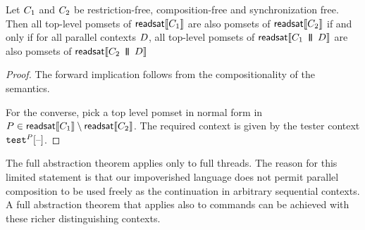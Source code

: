 \begin{theorem}
  Let $C_1$ and $C_2$ be restriction-free, composition-free and
  synchronization free.  Then all top-level pomsets of
  $\mathsf{readsat}\llbracket C_1\rrbracket$ are also pomsets of $\mathsf{readsat}\llbracket C_2\rrbracket$ if
  and only if for all parallel contexts $D$, all top-level pomsets of
  $\mathsf{readsat}\llbracket C_1 \,\mathbin{\texttt{\textbf{|}}\mkern-6mu\texttt{\textbf{|}}}\, D\rrbracket$ are also pomsets of
  $\mathsf{readsat}\llbracket C_2 \,\mathbin{\texttt{\textbf{|}}\mkern-6mu\texttt{\textbf{|}}}\, D\rrbracket$
\begin{proof}
  The forward implication follows from the compositionality of the semantics.

  For the converse, pick a top level pomset in normal form in
  $P \in \mathsf{readsat}\llbracket C_1\rrbracket \setminus \mathsf{readsat}\llbracket C_2\rrbracket $.  The
  required context is given by the tester context $\testP{\aPS}{}\hole{}$.
 \end{proof}
\end{theorem}

The full abstraction theorem applies only to full threads.  The reason for this limited statement is that our impoverished language does not permit  parallel composition to be used freely as the continuation in arbitrary sequential contexts.  A full abstraction theorem that applies also to commands can be achieved with these richer distinguishing contexts.  
